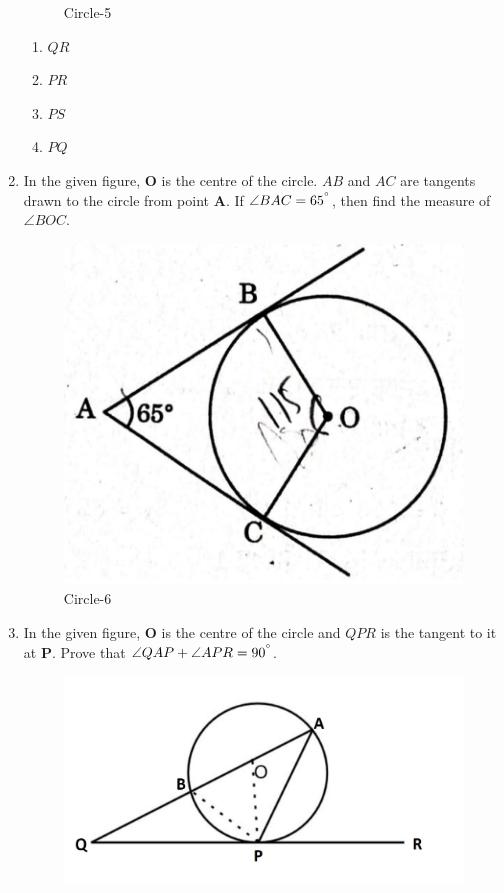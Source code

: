 \documentclass{article}
\let\vec\mathbf
\begin{document}
\begin{enumerate}
\begin{figure}[H]
			\caption{Circle-5}
			\label{fig:circle}
		\end{figure}
		\begin{enumerate}
			\item $ QR $
			\item $ PR $
			\item $ PS $
			\item $ PQ $
		\end{enumerate}
	\item In the given figure, $ \vec{O} $ is the centre of the circle. $ AB $ and $ AC $ are tangents drawn to the circle from point $ \vec{A} $. If $ \angle{BAC} = 65^{\degree} $, then find the measure of $ \angle{BOC} $.
		\begin{figure}[H]
			\centering
			\includegraphics[width=\columnwidth]{fig7.jpg}
			\caption{Circle-6}
			\label{fig:crcle}
		\end{figure}
	\item In the given figure, $ \vec{O} $ is the centre of the circle and $ QPR $ is the tangent to it at $ \vec{P} $. Prove that $ \angle{QAP} + \angle{APR} = 90^{\degree} $.
		\begin{figure}[H]
			\centering
			\includegraphics[width=\columnwidth]{fig8.jpg}

\end{figure}
\end{enumerate}
\end{document}
